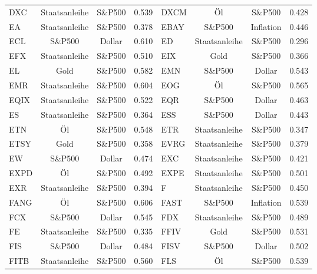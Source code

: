 \begin{longtable}{l c c c | l c c c}
    DXC    & Staatsanleihe & S\&P500   & 0.539         & DXCM   & Öl            & S\&P500   & 0.428         \\
    EA     & Staatsanleihe & S\&P500   & 0.378         & EBAY   & S\&P500       & Inflation & 0.446         \\
    ECL    & S\&P500       & Dollar    & 0.610         & ED     & Staatsanleihe & S\&P500   & 0.296         \\
    EFX    & Staatsanleihe & S\&P500   & 0.510         & EIX    & Gold          & S\&P500   & 0.366         \\
    EL     & Gold          & S\&P500   & 0.582         & EMN    & S\&P500       & Dollar    & 0.543         \\
    EMR    & Staatsanleihe & S\&P500   & 0.604         & EOG    & Öl            & S\&P500   & 0.565         \\
    EQIX   & Staatsanleihe & S\&P500   & 0.522         & EQR    & S\&P500       & Dollar    & 0.463         \\
    ES     & Staatsanleihe & S\&P500   & 0.364         & ESS    & S\&P500       & Dollar    & 0.443         \\
    ETN    & Öl            & S\&P500   & 0.548         & ETR    & Staatsanleihe & S\&P500   & 0.347         \\
    ETSY   & Gold          & S\&P500   & 0.358         & EVRG   & Staatsanleihe & S\&P500   & 0.379         \\
    EW     & S\&P500       & Dollar    & 0.474         & EXC    & Staatsanleihe & S\&P500   & 0.421         \\
    EXPD   & Öl            & S\&P500   & 0.492         & EXPE   & Staatsanleihe & S\&P500   & 0.501         \\
    EXR    & Staatsanleihe & S\&P500   & 0.394         & F      & Staatsanleihe & S\&P500   & 0.450         \\
    FANG   & Öl            & S\&P500   & 0.606         & FAST   & S\&P500       & Inflation & 0.539         \\
    FCX    & S\&P500       & Dollar    & 0.545         & FDX    & Staatsanleihe & S\&P500   & 0.489         \\
    FE     & Staatsanleihe & S\&P500   & 0.335         & FFIV   & Gold          & S\&P500   & 0.531         \\
    FIS    & S\&P500       & Dollar    & 0.484         & FISV   & S\&P500       & Dollar    & 0.502         \\
    FITB   & Staatsanleihe & S\&P500   & 0.560         & FLS    & Öl            & S\&P500   & 0.539         \\

\end{longtable}

